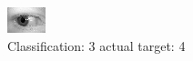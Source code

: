 \begin{figure}[h!]
\begin{center}
\includegraphics[width=0.60\columnwidth]{figures/ID761_class_3_target_4.png}
\end{center}
\caption{ Classification: 3 actual target: 4}
\label{fig:ID761_class_3_target_4}
\end{figure}
